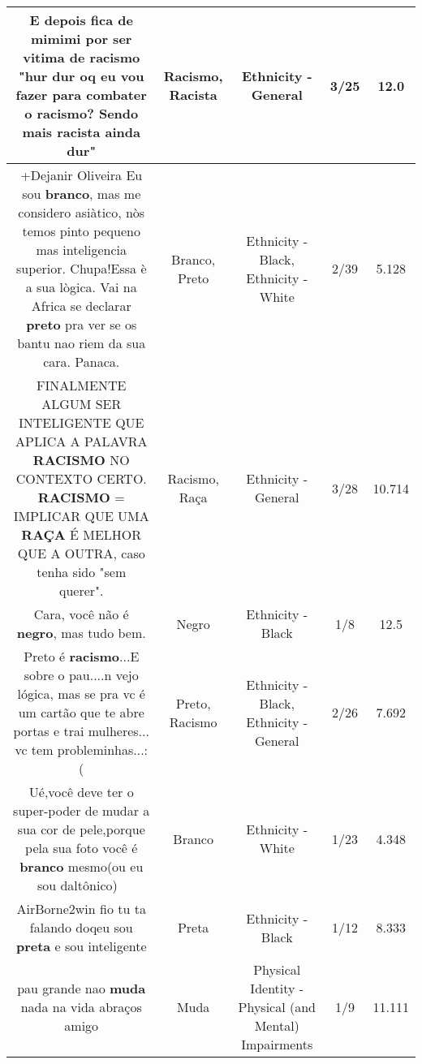 \documentclass[11pt]{article}
\newlength\mylength
\begin{document}
\begin{center}
\begin{longtable}{|C{.65\mylength}|C{.30\mylength}|C{.12\mylength}|C{.12\mylength}|C{.12\mylength}|}
  \small E depois fica de mimimi por ser vitima de \textbf{racismo} "hur dur oq eu vou fazer para combater o \textbf{racismo}? Sendo mais \textbf{racista} ainda dur"\normalsize   & Racismo, Racista & Ethnicity - General & 3/25 & 12.0 \\  \hline
  \small +Dejanir Oliveira  Eu sou \textbf{branco}, mas me considero asiàtico, nòs temos pinto pequeno mas inteligencia superior. Chupa!Essa è a sua lògica. Vai na Africa se declarar \textbf{preto} pra ver se os bantu nao riem da sua cara. Panaca.\normalsize   & Branco, Preto & Ethnicity - Black, Ethnicity - White & 2/39 & 5.128 \\  \hline
  \small FINALMENTE ALGUM SER INTELIGENTE QUE APLICA A PALAVRA \textbf{RACISMO} NO CONTEXTO CERTO.  \textbf{RACISMO} = IMPLICAR QUE UMA \textbf{RAÇA} É MELHOR QUE A OUTRA, caso tenha sido "sem querer".\normalsize   & Racismo, Raça & Ethnicity - General & 3/28 & 10.714 \\  \hline
  \small Cara, você não é \textbf{negro}, mas tudo bem.\normalsize   & Negro & Ethnicity - Black & 1/8 & 12.5 \\  \hline
  \small Preto é \textbf{racismo}...E sobre o pau....n vejo lógica, mas se pra vc é um cartão que te abre portas e trai mulheres... vc tem probleminhas...:(\normalsize   & Preto, Racismo & Ethnicity - Black, Ethnicity - General & 2/26 & 7.692 \\  \hline
  \small Ué,você deve ter o super-poder de mudar a sua cor de pele,porque pela sua foto você é \textbf{branco} mesmo(ou eu sou daltônico) 🤔\normalsize   & Branco & Ethnicity - White & 1/23 & 4.348 \\  \hline
  \small AirBorne2win fio tu ta falando doqeu sou \textbf{preta} e sou inteligente\normalsize   & Preta & Ethnicity - Black & 1/12 & 8.333 \\  \hline
  \small pau grande nao \textbf{muda} nada na vida abraços amigo\normalsize   & Muda & Physical Identity - Physical (and Mental) Impairments & 1/9 & 11.111 \\  \hline

\end{longtable}
\end{center}
\end{document}
